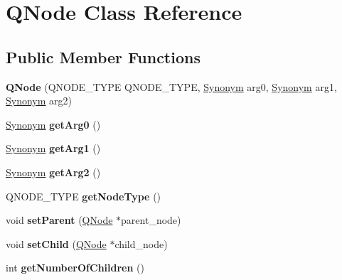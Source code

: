 \hypertarget{class_q_node}{}\section{Q\+Node Class Reference}
\label{class_q_node}
\subsection*{Public Member Functions}
\begin{DoxyCompactItemize}
\item 
\hypertarget{class_q_node_a096bc274f1d8004d080d4f1f7ffd4a39}{}{\bfseries Q\+Node} (Q\+N\+O\+D\+E\+\_\+\+T\+Y\+P\+E Q\+N\+O\+D\+E\+\_\+\+T\+Y\+P\+E, \hyperlink{class_synonym}{Synonym} arg0, \hyperlink{class_synonym}{Synonym} arg1, \hyperlink{class_synonym}{Synonym} arg2)\label{class_q_node_a096bc274f1d8004d080d4f1f7ffd4a39}

\item 
\hypertarget{class_q_node_a9f5409ff0bb2bd20dfe7dd8a3c7c0dc1}{}\hyperlink{class_synonym}{Synonym} {\bfseries get\+Arg0} ()\label{class_q_node_a9f5409ff0bb2bd20dfe7dd8a3c7c0dc1}

\item 
\hypertarget{class_q_node_af3b531d0d3db7344301719aee999f296}{}\hyperlink{class_synonym}{Synonym} {\bfseries get\+Arg1} ()\label{class_q_node_af3b531d0d3db7344301719aee999f296}

\item 
\hypertarget{class_q_node_a407c0fbee2c672d81ba9da8fd8d7a1c7}{}\hyperlink{class_synonym}{Synonym} {\bfseries get\+Arg2} ()\label{class_q_node_a407c0fbee2c672d81ba9da8fd8d7a1c7}

\item 
\hypertarget{class_q_node_a157175baf5c4a58889b6d1473dcffba1}{}Q\+N\+O\+D\+E\+\_\+\+T\+Y\+P\+E {\bfseries get\+Node\+Type} ()\label{class_q_node_a157175baf5c4a58889b6d1473dcffba1}

\item 
\hypertarget{class_q_node_a09b45baa3195be5e02292a614a6e0fcc}{}void {\bfseries set\+Parent} (\hyperlink{class_q_node}{Q\+Node} $\ast$parent\+\_\+node)\label{class_q_node_a09b45baa3195be5e02292a614a6e0fcc}

\item 
\hypertarget{class_q_node_a39ef3abafa6774e3e8ddbd1574363ba3}{}void {\bfseries set\+Child} (\hyperlink{class_q_node}{Q\+Node} $\ast$child\+\_\+node)\label{class_q_node_a39ef3abafa6774e3e8ddbd1574363ba3}

\item 
\hypertarget{class_q_node_a56855b3052ac68ea911e7a626fab366b}{}int {\bfseries get\+Number\+Of\+Children} ()\label{class_q_node_a56855b3052ac68ea911e7a626fab366b}


\end{DoxyCompactItemize}
